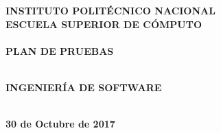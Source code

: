 \newpage
\begin{center}
\thispagestyle{empty}
\LARGE{\textsc {\textbf{INSTITUTO POLITÉCNICO NACIONAL}}}\\[0.5cm]
\Large{\textbf{ESCUELA SUPERIOR DE CÓMPUTO}}\\[0.7cm]
\vspace{5cm}
\LARGE{\textbf{\\PLAN DE PRUEBAS\\}}
\vspace{7cm}
\end{center}
\Large{\textbf{\\INGENIERÍA DE SOFTWARE}}
\vspace{5cm}
\begin{flushright}
\Large{\textbf{\\30 de Octubre de 2017}}
\end{flushright}
\newpage